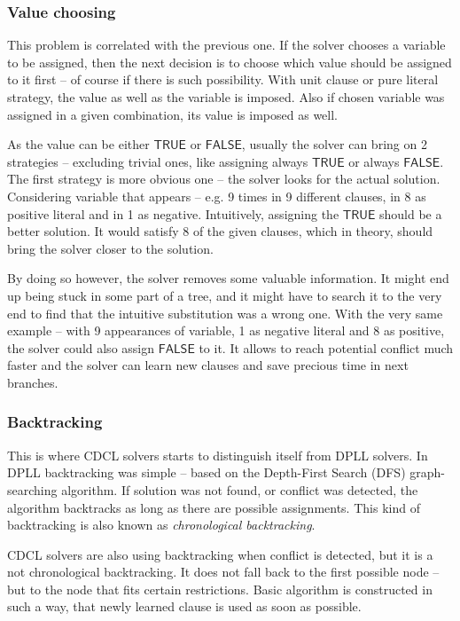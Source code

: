 \documentclass[12pt,english,pdflatex]{aghdpl}
\begin{document}
\subsubsection{Value choosing}
\label{subsubsec:Value}
This problem is correlated with the previous one. If the solver chooses
a variable to be assigned, then the next decision is to choose which
value should be assigned to it first -- of course if there is
such possibility. With unit clause or pure literal strategy, the value as well
as the variable is imposed. Also if chosen variable was assigned in a given 
combination, its value is imposed as well. 

As the value can be either $\mathsf{TRUE}$ or $\mathsf{FALSE}$, usually the solver can bring
on 2 strategies -- excluding trivial ones, like assigning always  $\mathsf{TRUE}$
or always $\mathsf{FALSE}$. The first strategy is more obvious one -- the solver looks
for the actual solution. Considering variable that appears -- e.g. 9 times
in 9 different clauses, in 8 as positive literal and in 1 as negative.
Intuitively, assigning the  $\mathsf{TRUE}$  should be a better solution. It would satisfy
8 of the given clauses, which in theory, should bring the solver closer to the solution. 

By doing so however, the solver removes some valuable information. It might
end up being stuck in some part of a tree, and it might have to search
it to the very end to find that the intuitive substitution was a wrong one. 
 With the very same example -- with 9 appearances of variable,
1 as negative literal and 8 as positive, the solver could also assign
$\mathsf{FALSE}$ to it. It allows to reach potential conflict much faster and
the solver can learn new clauses and save precious time in next branches.

\subsubsection{Backtracking}
\label{subsubsec:Backtrack}
This is where CDCL solvers starts to distinguish itself from DPLL
solvers. In DPLL backtracking was simple -- based on the Depth-First Search (DFS) graph-searching algorithm.
If solution was not found, or conflict was detected, the algorithm
backtracks as long as there are possible assignments. This kind of
backtracking is also known as \textit{chronological backtracking}.

CDCL solvers are also using backtracking when conflict is detected, but it is a not chronological backtracking.
It does not fall back to the first possible node -- but to the node that fits 
certain restrictions. Basic algorithm is constructed
in such a way, that newly learned clause is used as soon as possible.
\end{document}
